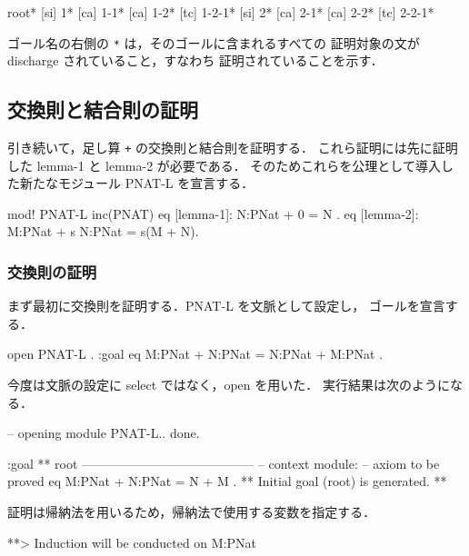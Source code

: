 \documentclass[a4paper,oneside,10pt,here]{memoir}
\newenvironment{vvtm}%
{\parskip=0pt\lineskip=0pt\begin{center}\begin{minipage}{0.8\textwidth}\begin{snugshade}}%
  {\end{snugshade}\end{minipage}\end{center}}
\begin{document}
\begin{vvtm}
  \begin{simplev}
root*
[si]  1*
[ca]  1-1*
[ca]  1-2*
[tc]  1-2-1*
[si]  2*
[ca]  2-1*
[ca]  2-2*
[tc]  2-2-1*
  \end{simplev}
\end{vvtm}
ゴール名の右側の \verb|*| は，そのゴールに含まれるすべての
証明対象の文が discharge されていること，すなわち
証明されていることを示す．

\subsection{交換則と結合則の証明}
引き続いて，足し算 \texttt{+} の交換則と結合則を証明する．
これら証明には先に証明した lemma-1 と lemma-2 が必要である．
そのためこれらを公理として導入した新たなモジュール PNAT-L を宣言する．

\begin{vvtm}
  \begin{simplev}
mod! PNAT-L {
  inc(PNAT)
  eq [lemma-1]: N:PNat + 0 = N .
  eq [lemma-2]: M:PNat + s N:PNat = s(M + N). 
}
  \end{simplev}
\end{vvtm}

\subsubsection{交換則の証明}

まず最初に交換則を証明する．PNAT-L を文脈として設定し，
ゴールを宣言する．
\begin{vvtm}
  \begin{simplev}
open PNAT-L .
:goal { eq M:PNat + N:PNat = N:PNat + M:PNat . }
  \end{simplev}
\end{vvtm}
今度は文脈の設定に select ではなく，open を用いた．
実行結果は次のようになる．
\begin{vvtm}
  \begin{simplev}
-- opening module PNAT-L.. done.

:goal { ** root -----------------------------------------
  -- context module: %
  -- axiom to be proved
    eq M:PNat + N:PNat = N + M .
}
** Initial goal (root) is generated. **
  \end{simplev}
\end{vvtm}

証明は帰納法を用いるため，帰納法で使用する変数を指定する．
\begin{vvtm}
  \begin{simplev}
**> Induction will be conducted on M:PNat 
  \end{simplev}
\end{vvtm}
\end{document}

